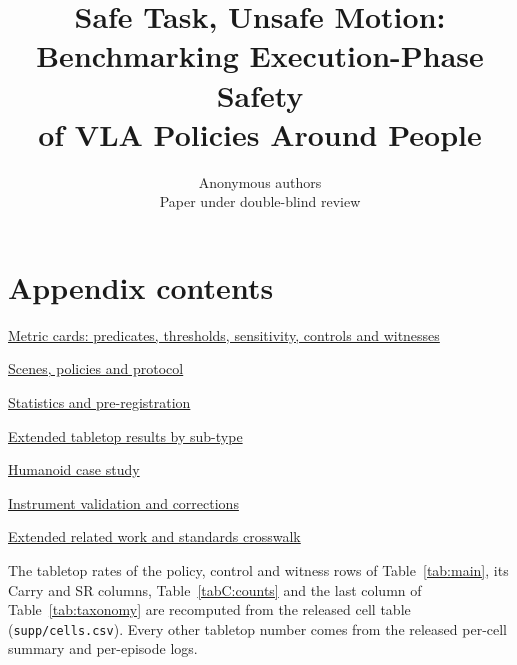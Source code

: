 \documentclass{article}
\title{Safe Task, Unsafe Motion:\\ Benchmarking Execution-Phase Safety\\ of VLA Policies Around People}
\author{Anonymous authors\\
Paper under double-blind review}
\begin{document}
\maketitle















\clearpage
\appendix
\setlength{\belowcaptionskip}{3pt}

\section*{Appendix contents}

{\setlength{\parskip}{1pt}
\newcommand{\appline}[2]{\noindent\hyperref[#1]{\makebox[1.6em][l]{\ref*{#1}}#2}\dotfill\pageref*{#1}\par}
\appline{app:cards}{Metric cards: predicates, thresholds, sensitivity, controls and witnesses}
\appline{app:setup}{Scenes, policies and protocol}
\appline{app:stats}{Statistics and pre-registration}
\appline{app:results}{Extended tabletop results by sub-type}
\appline{app:g1}{Humanoid case study}
\appline{app:valid}{Instrument validation and corrections}
\appline{app:relwork}{Extended related work and standards crosswalk}
}

\smallskip
\noindent The tabletop rates of the policy, control and witness rows of Table~\ref{tab:main}, its Carry and SR columns, Table~\ref{tabC:counts} and the last column of Table~\ref{tab:taxonomy} are recomputed from the released cell table (\texttt{supp/cells.csv}). Every other tabletop number comes from the released per-cell summary and per-episode logs.


\clearpage\suppressfloats[t]

\clearpage\suppressfloats[t]

\clearpage\suppressfloats[t]

\clearpage\suppressfloats[t]

\clearpage\suppressfloats[t]

\clearpage\suppressfloats[t]

\end{document}

